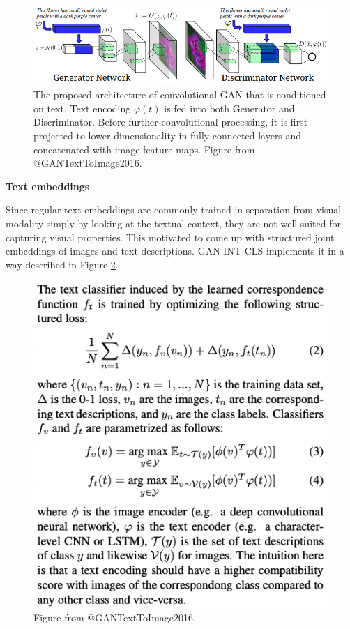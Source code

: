 \documentclass[
]{krantz}
\begin{document}
\begin{figure}

{\centering \includegraphics[width=0.8\linewidth]{figures/02-02-text-2-img/gancls} 

}

\caption{The proposed architecture of convolutional GAN that is conditioned on text. Text encoding $\varphi(t)$ is fed into both Generator and Discriminator. Before further convolutional processing, it is first projected to lower dimensionality in fully-connected layers and concatenated with image feature maps. Figure from @GANTextToImage2016.}\label{fig:gancls}
\end{figure}

\textbf{Text embeddings}

Since regular text embeddings are commonly trained in separation from visual modality simply by looking at the textual context, they are not well suited for capturing visual properties. This motivated \citet{JointRepresentations2016} to come up with structured joint embeddings of images and text descriptions. GAN-INT-CLS implements it in a way described in Figure \ref{fig:ganclsembeddings}.

\begin{figure}

{\centering \includegraphics[width=0.6\linewidth]{figures/02-02-text-2-img/ganclsembeddings} 

}

\caption{Figure from @GANTextToImage2016.}\label{fig:ganclsembeddings}
\end{figure}
\end{document}
